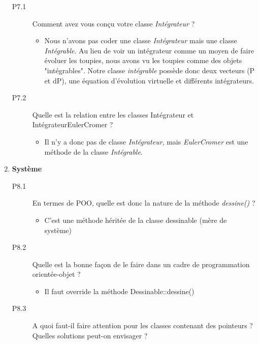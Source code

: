 \documentclass[a4paper]{article}
\begin{document}
\begin{enumerate}
			\begin{description}
				\item[P7.1]  Comment avez vous conçu votre classe \emph{Intégrateur} ? 
				
				\begin {itemize}
					\item Nous n'avons pas coder une classe \emph{Intégrateur} mais une classe \emph{Intégrable}. Au lieu de voir un intégrateur comme un moyen de faire évoluer les toupies, nous avons vu les toupies comme des objets "intégrables". Notre classe \emph{intégrable} possède donc deux vecteurs (P et dP), une équation d'évolution virtuelle et différents intégrateurs.
				\end {itemize}
				
				\item[P7.2] Quelle est la relation entre les classes Intégrateur et IntégrateurEulerCromer ?
				
				\begin {itemize}
					\item Il n'y a donc pas de classe \emph{Intégrateur}, mais \emph{EulerCromer} est une méthode de la classe \emph{Intégrable}.
				\end {itemize}
			\end{description}
		\item \textbf{Système}
		
			\begin{description}
				\item[P8.1] En termes de POO, quelle est donc la nature de la méthode \emph{dessine()} ?
			
				\begin{itemize} 
					\item C'est une méthode héritée de la classe dessinable (mère de système)
				\end{itemize}
			
				\item[P8.2] Quelle est la bonne façon de le faire dans un cadre de programmation orientée-objet ?
			
				\begin{itemize} 
					\item Il faut override la méthode Dessinable::dessine()
				\end{itemize}
			
				\item[P8.3] A quoi faut-il faire attention pour les classes contenant des pointeurs ? Quelles solutions peut-on envisager ?
			

\end{description}
\end{enumerate}
\end{document}
